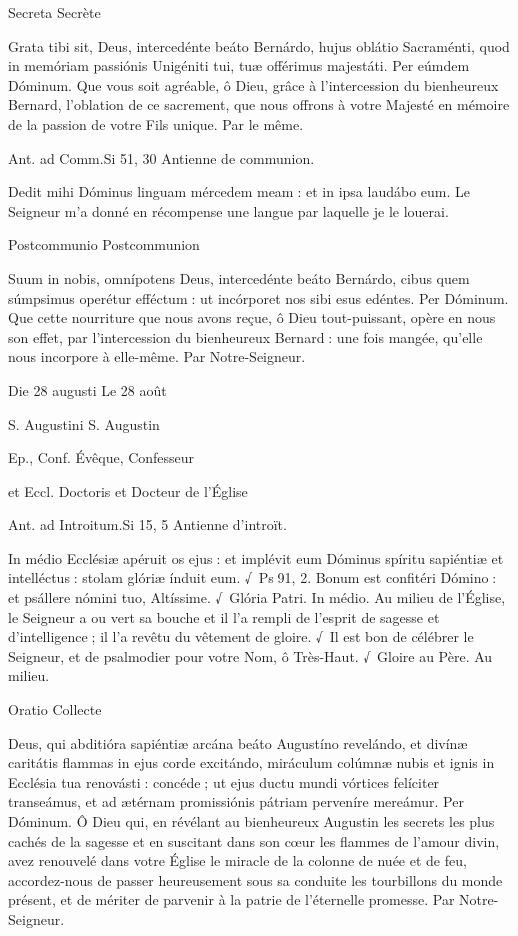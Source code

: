 \begin{paracol}{2}
Secreta
\switchcolumn
Secrète
\switchcolumn*

Grata tibi sit, Deus, intercedénte  beáto Bernárdo, hujus oblátio Sacraménti, quod in memóriam passiónis Unigéniti tui, tuæ offérimus majestáti. Per eúmdem Dóminum.
\switchcolumn
Que vous soit agréable, ô Dieu, grâce  à l’intercession du bienheureux Bernard, l’oblation de ce sacrement, que nous offrons à votre Majesté en mémoire de la passion de votre Fils unique. Par le même.
\switchcolumn*

Ant. ad Comm.\hfill Si 51, 30
\switchcolumn
Antienne de communion.
\switchcolumn*

Dedit mihi Dóminus linguam mércedem meam : et in ipsa laudábo eum.
\switchcolumn
Le Seigneur m’a donné en récompense une langue par laquelle je le louerai.
\switchcolumn*

Postcommunio
\switchcolumn
Postcommunion
\switchcolumn*

Suum in nobis, omnípotens Deus, intercedénte beáto Bernárdo, cibus quem súmpsimus operétur efféctum : ut incórporet nos sibi esus edéntes. Per Dóminum.
\switchcolumn
Que cette nourriture que nous avons reçue, ô Dieu tout-puissant, opère en nous son effet, par l’intercession du bienheureux Bernard : une fois mangée, qu’elle nous incorpore à elle-même. Par Notre-Seigneur.
\switchcolumn*

Die 28 augusti
\switchcolumn
Le 28 août
\switchcolumn*

S. Augustini
\switchcolumn
S. Augustin
\switchcolumn*

Ep., Conf.
\switchcolumn
Évêque, Confesseur
\switchcolumn*

et Eccl. Doctoris
\switchcolumn
et Docteur de l’Église
\switchcolumn*

Ant. ad Introitum.\hfill Si 15, 5
\switchcolumn
Antienne d’introït.
\switchcolumn*

In médio Ecclésiæ apéruit os ejus :  et implévit eum Dóminus spíritu sapiéntiæ et intelléctus : stolam glóriæ índuit eum. √~Ps 91, 2. Bonum est confitéri Dómino : et psállere nómini tuo, Altíssime. √~Glória Patri. In médio.
\switchcolumn
Au milieu de l’Église, le Seigneur a ou vert sa bouche et il l’a rempli de l’esprit de sagesse et d’intelligence ; il l’a revêtu du vêtement de gloire. √~Il est bon de célébrer le Seigneur, et de psalmodier pour votre Nom, ô Très-Haut. √~Gloire au Père. Au milieu.
\switchcolumn*

Oratio
\switchcolumn
Collecte
\switchcolumn*

Deus, qui abditióra sapiéntiæ arcána  beáto Augustíno revelándo, et divínæ caritátis flammas in ejus corde excitándo, miráculum colúmnæ nubis et ignis in Ecclésia tua renovásti : concéde ; ut ejus ductu mundi vórtices felíciter transeámus, et ad ætérnam promissiónis pátriam perveníre mereámur. Per Dóminum.
\switchcolumn
Ô Dieu qui, en révélant au bienheureux  Augustin les secrets les plus cachés de la sagesse et en suscitant dans son cœur les flammes de l’amour divin, avez renouvelé dans votre Église le miracle de la colonne de nuée et de feu, accordez-nous de passer heureusement sous sa conduite les tourbillons du monde présent, et de mériter de parvenir à la patrie de l’éternelle promesse. Par Notre-Seigneur.
\switchcolumn*


\end{paracol}
